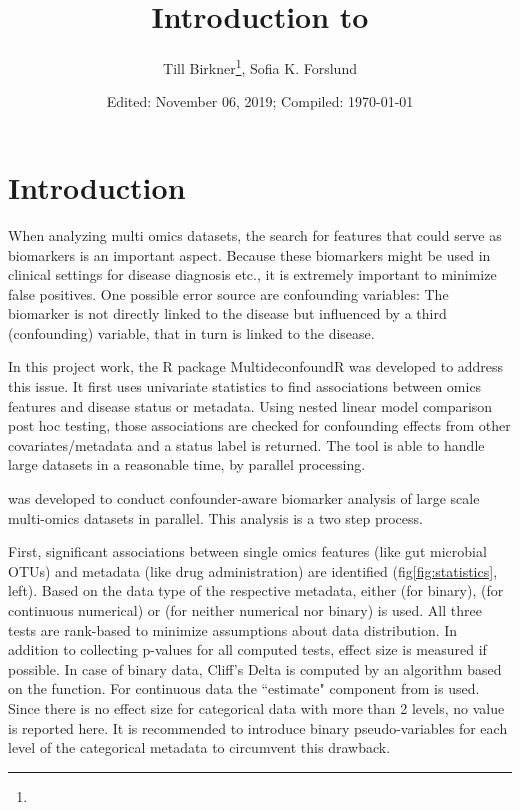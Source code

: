 \documentclass{article}\usepackage[]{graphicx}\usepackage[usenames,dvipsnames]{color}
\title{Introduction to \metadeconfoundR}
\author{Till Birkner\footnote{\email{tillb@online.de}}, Sofia K. Forslund}
\date{Edited: November 06, 2019; Compiled: \today}
\begin{document}
\maketitle

\tableofcontents

\section{Introduction}
When analyzing multi omics datasets, the search for features that could serve as biomarkers is an important aspect. Because these biomarkers might be used in clinical settings for disease diagnosis etc., it is extremely important to minimize false positives. One possible error source are confounding variables: The biomarker is not directly linked to the disease but influenced by a third (confounding) variable, that in turn is linked to the disease.

In this project work, the R package MultideconfoundR was developed to address this issue. It first uses univariate statistics to find associations between omics features and disease status or metadata. Using nested linear model comparison post hoc testing, those associations are checked for confounding effects from other covariates/metadata and a status label is returned. The tool is able to handle large datasets in a reasonable time, by parallel processing.


 was developed to conduct confounder-aware biomarker analysis of large scale multi-omics datasets in parallel. This analysis is a two step process. 

First, significant associations between single omics features (like gut microbial OTUs) and metadata (like drug administration) are identified (fig\ref{fig:statistics}, left). Based on the data type of the respective metadata, either  (for binary),  (for continuous numerical) or  (for neither numerical nor binary) is used. All three tests are rank-based to minimize assumptions about data distribution.
In addition to collecting p-values for all computed tests, effect size is measured if possible. In case of binary data, Cliff's Delta is computed by an algorithm based on the  function. For continuous data the ``estimate" component from  is used. Since there is no effect size for categorical data with more than 2 levels, no value is reported here. It is recommended to introduce binary pseudo-variables for each level of the categorical metadata to circumvent this drawback.
    
\end{document}
